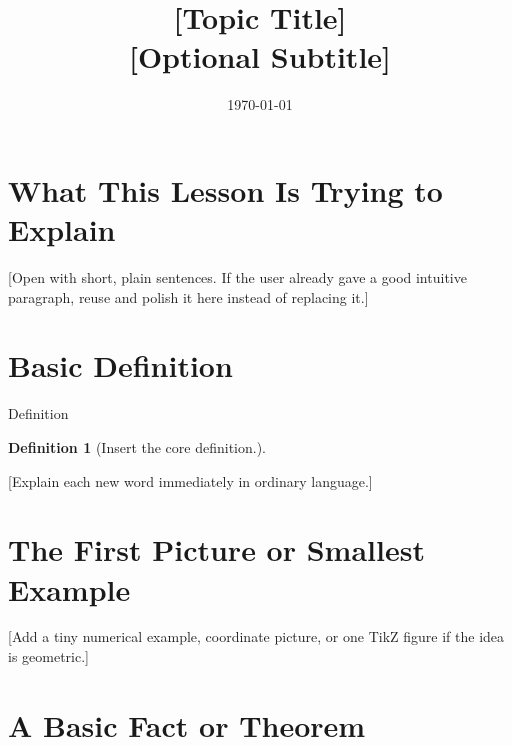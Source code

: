 \documentclass[11pt,a4paper]{article}
\title{[Topic Title]\\\large [Optional Subtitle]}
\author{}
\date{\today}
\newtheorem{definition}[theorem]{Definition}
\begin{document}
\maketitle
\tableofcontents
\newpage

\section{What This Lesson Is Trying to Explain}

\begin{problemblock}
\end{problemblock}

[Open with short, plain sentences. If the user already gave a good intuitive paragraph,
reuse and polish it here instead of replacing it.]

\begin{intuitionblock}
\end{intuitionblock}

\begin{keypointblock}
\end{keypointblock}

\section{Basic Definition}

\begin{mathblock}{Definition}
\begin{definition}
[Insert the core definition.]
\end{definition}
\end{mathblock}

[Explain each new word immediately in ordinary language.]

\section{The First Picture or Smallest Example}

[Add a tiny numerical example, coordinate picture, or one TikZ figure if the idea is geometric.]

\section{A Basic Fact or Theorem}
\end{document}

